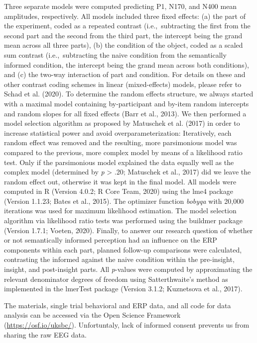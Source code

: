 \documentclass[
  english,
  man,12pt,twoside]{apa7}
\begin{document}
Three separate models were computed predicting P1, N170, and N400 mean amplitudes, respectively. All models included three fixed effects: (a) the part of the experiment, coded as a repeated contrast (i.e.,~subtracting the first from the second part and the second from the third part, the intercept being the grand mean across all three parts), (b) the condition of the object, coded as a scaled sum contrast (i.e.,~subtracting the naive condition from the semantically informed condition, the intercept being the grand mean across both conditions), and (c) the two-way interaction of part and condition. For details on these and other contrast coding schemes in linear (mixed-effects) models, please refer to Schad et al. (2020). To determine the random effects structure, we always started with a maximal model containing by-participant and by-item random intercepts and random slopes for all fixed effects (Barr et al., 2013). We then performed a model selection algorithm as proposed by Matuschek et al. (2017) in order to increase statistical power and avoid overparameterization: Iteratively, each random effect was removed and the resulting, more parsimonious model was compared to the previous, more complex model by means of a likelihood ratio test. Only if the parsimonious model explained the data equally well as the complex model (determined by \emph{p} \textgreater{} .20; Matuschek et al., 2017) did we leave the random effect out, otherwise it was kept in the final model. All models were computed in R (Version 4.0.2; R Core Team, 2020) using the lme4 package (Version 1.1.23; Bates et al., 2015). The optimizer function \emph{bobyqa} with 20,000 iterations was used for maximum likelihood estimation. The model selection algorithm via likelihood ratio tests was performed using the buildmer package (Version 1.7.1; Voeten, 2020). Finally, to answer our research question of whether or not semantically informed perception had an influence on the ERP components within each part, planned follow-up comparisons were calculated, contrasting the informed against the naive condition within the pre-insight, insight, and post-insight parts. All \emph{p}-values were computed by approximating the relevant denominator degrees of freedom using Satterthwaite's method as implemented in the lmerTest package (Version 3.1.2; Kuznetsova et al., 2017).

The materials, single trial behavioral and ERP data, and all code for data analysis can be accessed via the Open Science Framework (\url{https://osf.io/uksbc/}). Unfortuntaly, lack of informed consent prevents us from sharing the raw EEG data.
\end{document}
